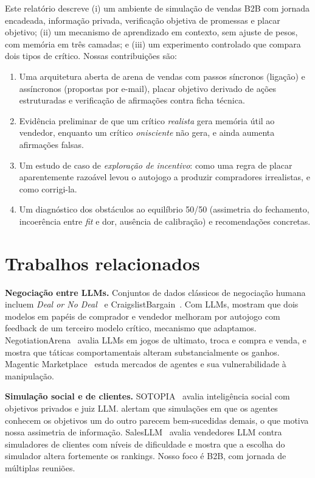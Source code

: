 \documentclass[11pt,a4paper]{article}
\begin{document}
Este relatório descreve (i) um ambiente de simulação de vendas B2B com jornada encadeada, informação privada, verificação objetiva de promessas e placar objetivo; (ii) um mecanismo de aprendizado em contexto, sem ajuste de pesos, com memória em três camadas; e (iii) um experimento controlado que compara dois tipos de crítico. Nossas contribuições são:

\begin{enumerate}
  \item Uma arquitetura aberta de arena de vendas com passos síncronos (ligação) e assíncronos (propostas por e-mail), placar objetivo derivado de ações estruturadas e verificação de afirmações contra ficha técnica.
  \item Evidência preliminar de que um crítico \emph{realista} gera memória útil ao vendedor, enquanto um crítico \emph{onisciente} não gera, e ainda aumenta afirmações falsas.
  \item Um estudo de caso de \emph{exploração de incentivo}: como uma regra de placar aparentemente razoável levou o autojogo a produzir compradores irrealistas, e como corrigi-la.
  \item Um diagnóstico dos obstáculos ao equilíbrio 50/50 (assimetria do fechamento, incoerência entre \emph{fit} e dor, ausência de calibração) e recomendações concretas.
\end{enumerate}

\section{Trabalhos relacionados}

\textbf{Negociação entre LLMs.} Conjuntos de dados clássicos de negociação humana incluem \emph{Deal or No Deal}~\cite{lewis2017deal} e CraigslistBargain~\cite{he2018decoupling}. Com LLMs, \citet{fu2023improving} mostram que dois modelos em papéis de comprador e vendedor melhoram por autojogo com feedback de um terceiro modelo crítico, mecanismo que adaptamos. NegotiationArena~\cite{bianchi2024negotiationarena} avalia LLMs em jogos de ultimato, troca e compra e venda, e mostra que táticas comportamentais alteram substancialmente os ganhos. Magentic Marketplace~\cite{magentic2025} estuda mercados de agentes e sua vulnerabilidade à manipulação.

\textbf{Simulação social e de clientes.} SOTOPIA~\cite{zhou2024sotopia} avalia inteligência social com objetivos privados e juiz LLM. \citet{zhou2024reallife} alertam que simulações em que os agentes conhecem os objetivos um do outro parecem bem-sucedidas demais, o que motiva nossa assimetria de informação. SalesLLM~\cite{salesllm2026} avalia vendedores LLM contra simuladores de clientes com níveis de dificuldade e mostra que a escolha do simulador altera fortemente os rankings. Nosso foco é B2B, com jornada de múltiplas reuniões.
\end{document}
